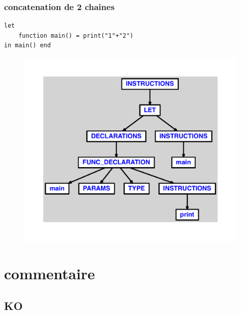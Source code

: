 \documentclass{article}
\begin{document}
\subsubsection{concatenation de 2 chaines}
\begin{lstlisting}
let
	function main() = print("1"+"2")
in main() end
\end{lstlisting}
\newpage
\begin{figure}[H]
\centering
\includegraphics[max width=\textwidth]{ast/ast_142.pdf}
\end{figure}
\newpage
\section{commentaire}
\subsection{KO}
\end{document}
